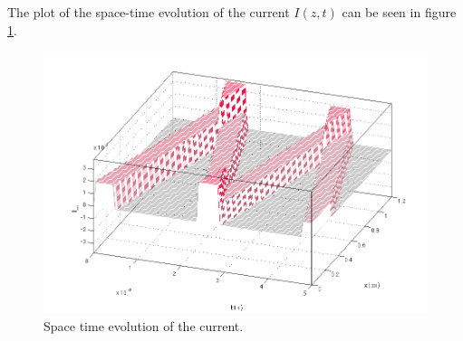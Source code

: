 \documentclass[final]{scrreprt} %
\begin{document}
The plot of the space-time evolution of the current $I(z,t)$ can be seen in figure \ref{fig:iplot}. 
\begin{figure}[H]
\centering
\includegraphics[width=\linewidth]{resources/Iplot.png}
\caption{Space time evolution of the current.}
\label{fig:iplot}
\end{figure}

\
\end{document}
